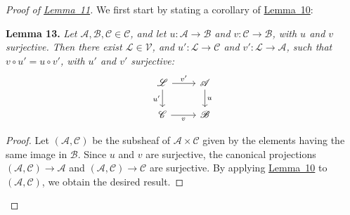 \documentclass{article}
\newenvironment{itenv}[1]
  {\phantomsection\par\medskip\noindent\textbf{#1.}\itshape}
  {\medskip}
\newcommand{\scr}[1]{{\mathscr{#1}}}
\renewcommand{\cal}[1]{{\mathcal{#1}}}
\begin{document}
\begin{proof}[Proof of {\hyperref[lemma11]{Lemma~11}}]
  We first start by stating a corollary of \hyperref[lemma10]{Lemma~10}:
  \begin{itenv}{Lemma 13}
  \label{lemma13}
    Let $\scr{A},\scr{B},\scr{C}\in\cal{C}$, and let $u\colon\scr{A}\to\scr{B}$ and $v\colon\scr{C}\to\scr{B}$, with $u$ and $v$ surjective.
    Then there exist $\scr{L}\in\cal{V}$, and $u'\colon\scr{L}\to\scr{C}$ and $v'\colon\scr{L}\to\scr{A}$, such that $v\circ u'=u\circ v'$, with $u'$ and $v'$ surjective:
    \[
      \begin{tikzcd}
        \scr{L} \ar[r,"v'"] \ar[d,swap,"u'"]
        & \scr{A} \ar[d,"u"]
      \\\scr{C} \ar[r,swap,"v"]
        & \scr{B}
      \end{tikzcd}
    \]
  \end{itenv}

  \begin{proof}
    Let $(\scr{A},\scr{C})$ be the subsheaf of $\scr{A}\times\scr{C}$ given by the elements having the same image in $\scr{B}$.
    Since $u$ and $v$ are surjective, the canonical projections $(\scr{A},\scr{C})\to\scr{A}$ and $(\scr{A},\scr{C})\to\scr{C}$ are surjective.
    By applying \hyperref[lemma10]{Lemma~10} to $(\scr{A},\scr{C})$, we obtain the desired result.
  \end{proof}


\end{proof}
\end{document}
